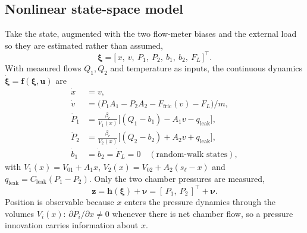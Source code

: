 \subsection{Nonlinear state-space model}
Take the state, augmented with the two flow-meter biases and the external load so
they are estimated rather than assumed,
\begin{equation}
\boldsymbol{\xi} = \big[\,x,\ v,\ P_1,\ P_2,\ b_1,\ b_2,\ F_L\,\big]^{\!\top}.
\end{equation}
With measured flows $Q_1,Q_2$ and temperature as inputs, the continuous dynamics
$\dot{\boldsymbol\xi}=\mathbf f(\boldsymbol\xi,\mathbf u)$ are
\begin{align}
\dot x   &= v, \\
\dot v   &= \big(P_1 A_1 - P_2 A_2 - F_{\text{fric}}(v) - F_L\big)/m, \\
\dot P_1 &= \tfrac{\beta_e}{V_1(x)}\big[(Q_1-b_1) - A_1 v - q_{\text{leak}}\big], \\
\dot P_2 &= \tfrac{\beta_e}{V_2(x)}\big[(Q_2-b_2) + A_2 v + q_{\text{leak}}\big], \\
\dot b_1 &= \dot b_2 = \dot F_L = 0 \quad(\text{random-walk states}),
\end{align}
with $V_1(x)=V_{01}+A_1x$, $V_2(x)=V_{02}+A_2(s_\ell-x)$ and
$q_{\text{leak}}=C_{\text{leak}}(P_1-P_2)$. Only the two chamber pressures are
measured,
\begin{equation}
\mathbf z = \mathbf h(\boldsymbol\xi) + \boldsymbol\nu
          = [\,P_1,\ P_2\,]^{\!\top} + \boldsymbol\nu .
\end{equation}
Position is observable because $x$ enters the pressure dynamics through the
volumes $V_i(x)$: $\partial \dot P_i/\partial x \neq 0$ whenever there is net
chamber flow, so a pressure innovation carries information about $x$.

